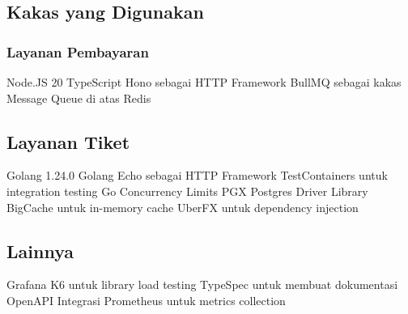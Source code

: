 \subsection{Kakas yang Digunakan}

\subsubsection{Layanan Pembayaran}

Node.JS 20
TypeScript
Hono sebagai HTTP Framework
BullMQ sebagai kakas Message Queue di atas Redis

\subsection{Layanan Tiket}

Golang 1.24.0
Golang Echo sebagai HTTP Framework
TestContainers untuk integration testing
Go Concurrency Limits
PGX Postgres Driver Library
BigCache untuk in-memory cache
UberFX untuk dependency injection

\subsection{Lainnya}

Grafana K6 untuk library load testing
TypeSpec untuk membuat dokumentasi OpenAPI
Integrasi Prometheus untuk metrics collection

